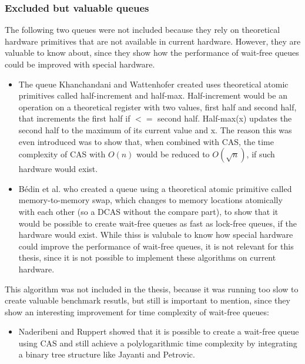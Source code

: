 \subsubsection{Excluded but valuable queues}
The following two queues were not included because they rely on theoretical hardware primitives that are not available in current hardware. However, they are valuable to know about, since they show how the performance of wait-free queues could be improved with special hardware.
\begin{itemize}
    \item The queue Khanchandani and Wattenhofer \cite{halfincrementhalfmax} created uses theoretical atomic primitives called half-increment and half-max. Half-increment would be an operation on a theoretical register with two values, first half and second half, that increments the first half if $<=$ second half. Half-max(x) updates the second half to the maximum of its current value and x. The reason this was even introduced was to show that, when combined with \ac{CAS}, the time complexity of \ac{CAS} with $O(n)$ would be reduced to $O(\sqrt{n})$, if such hardware would exist.
    \item Bédin et al. \cite{memorytomemory} who created a queue using a theoretical atomic primitive called memory-to-memory swap, which changes to memory locations atomically with each other (so a \ac{DCAS} without the compare part), to show that it would be possible to create wait-free queues as fast as lock-free queues, if the hardware would exist. While thiss is valubale to know how special hardware could improve the performance of wait-free queues, it is not relevant for this thesis, since it is not possible to implement these algorithms on current hardware.
\end{itemize}
This algorithm was not included in the thesis, because it was running too slow to create valuable benchmark resutls, but still is important to mention, since they show an interesting improvement for time complexity of wait-free queues:
\begin{itemize}
    \item Naderibeni and Ruppert \cite{polylog} showed that it is possible to create a wait-free queue using \ac{CAS} and still achieve a polylogarithmic time complexity by integrating a binary tree structure like Jayanti and Petrovic.
\end{itemize}
